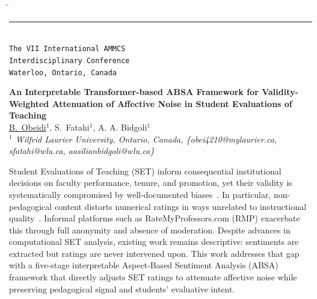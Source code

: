 \documentclass[11pt]{article}
\begin{document}
\thispagestyle{empty}
\begin{tabbing}
\hspace*{4.5in} \= {} \\[-5pt]
\rule{6.8 in}{0.01 in} \\[-2pt]
{} \> {\footnotesize\tt  The VII International AMMCS} \\[-5pt]
{} \> {\footnotesize\tt  Interdisciplinary Conference} \\[-5pt]
{} \> {\footnotesize\tt  Waterloo, Ontario, Canada} \\[-5pt]
\end{tabbing}
%
\vspace{-0.8cm}
\begin{flushleft}
\Large \textbf{\noindent
An Interpretable Transformer-based ABSA Framework for Validity-Weighted Attenuation of Affective Noise in Student Evaluations of Teaching}
\\
\vspace{0.3cm}
\normalsize
\normalsize{
\underline{B.~Obeidi}$^1$, S.~Fatahi$^1$, A. A. Bidgoli$^1$
} \\
\vspace{3mm}
\textit{\footnotesize
 $^1$ Wilfrid Laurier University, Ontario, Canada, \{obei4210@mylaurier.ca, sfatahi@wlu.ca, aasilianbidgoli@wlu.ca\}\\
}
\end{flushleft}

Student Evaluations of Teaching (SET) inform consequential institutional decisions on
faculty performance, tenure, and promotion, yet their validity is systematically compromised by well-documented biases~\cite{MR97}. In particular, non-pedagogical content distorts numerical ratings in ways unrelated to instructional quality~\cite{W11}. Informal platforms
such as RateMyProfessors.com (RMP) exacerbate this through full anonymity and absence of
moderation. Despite advances in computational SET analysis, existing work remains
descriptive: sentiments are extracted but ratings are never intervened upon. This work
addresses that gap with a five-stage interpretable Aspect-Based Sentiment Analysis (ABSA)
framework that directly adjusts SET ratings to attenuate affective noise while preserving
pedagogical signal and students' evaluative intent.
\end{document}

